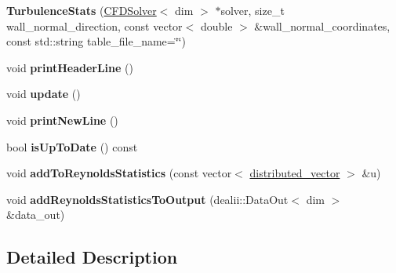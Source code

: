 \begin{DoxyCompactItemize}
\item 
\hypertarget{classnatrium_1_1TurbulenceStats_a03476c58932dd439697b42af9f9ba9fa}{
{\bfseries TurbulenceStats} (\hyperlink{classnatrium_1_1CFDSolver}{CFDSolver}$<$ dim $>$ $\ast$solver, size\_\-t wall\_\-normal\_\-direction, const vector$<$ double $>$ \&wall\_\-normal\_\-coordinates, const std::string table\_\-file\_\-name=\char`\"{}\char`\"{})}
\label{classnatrium_1_1TurbulenceStats_a03476c58932dd439697b42af9f9ba9fa}

\item 
\hypertarget{classnatrium_1_1TurbulenceStats_a0445764cda51567b087e0ed1e06af7db}{
void {\bfseries printHeaderLine} ()}
\label{classnatrium_1_1TurbulenceStats_a0445764cda51567b087e0ed1e06af7db}

\item 
\hypertarget{classnatrium_1_1TurbulenceStats_a53ec4c34c78255c034a5162a7952b8a5}{
void {\bfseries update} ()}
\label{classnatrium_1_1TurbulenceStats_a53ec4c34c78255c034a5162a7952b8a5}

\item 
\hypertarget{classnatrium_1_1TurbulenceStats_ac83716ce317bc97f50b744db7e1a7207}{
void {\bfseries printNewLine} ()}
\label{classnatrium_1_1TurbulenceStats_ac83716ce317bc97f50b744db7e1a7207}

\item 
\hypertarget{classnatrium_1_1TurbulenceStats_a81095f073023159b2c7b6bfbe07c30af}{
bool {\bfseries isUpToDate} () const }
\label{classnatrium_1_1TurbulenceStats_a81095f073023159b2c7b6bfbe07c30af}

\item 
\hypertarget{classnatrium_1_1TurbulenceStats_a093c01defdb4aa163f4310b8e6d22950}{
void {\bfseries addToReynoldsStatistics} (const vector$<$ \hyperlink{namespacenatrium_a903d2b92917f582f2ff05f52160ab811}{distributed\_\-vector} $>$ \&u)}
\label{classnatrium_1_1TurbulenceStats_a093c01defdb4aa163f4310b8e6d22950}

\item 
\hypertarget{classnatrium_1_1TurbulenceStats_a3e06bee00b984cb5fdc08f28e0e5d06e}{
void {\bfseries addReynoldsStatisticsToOutput} (dealii::DataOut$<$ dim $>$ \&data\_\-out)}
\label{classnatrium_1_1TurbulenceStats_a3e06bee00b984cb5fdc08f28e0e5d06e}

\end{DoxyCompactItemize}


\subsection{Detailed Description}
